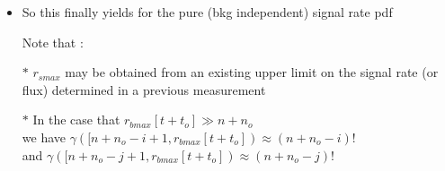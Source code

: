 \Tr
\begin{itemize}
\item So this finally yields for the pure (bkg independent) signal rate pdf
\item[] \begin{center}
      {\blue {}}
        \end{center}
\item[] Note that :
\item[$\ast$] $r_{smax}$ may be obtained from an existing upper limit on the signal rate (or flux)
              determined in a previous measurement
\item[$\ast$] In the case that $r_{bmax}[t+t_{o}] \gg n+n_{o}$\\
      we have $\gamma([n+n_{o}-i+1,r_{bmax}[t+t_{o}]) \approx (n+n_{o}-i)!$\\
      and $\gamma([n+n_{o}-j+1,r_{bmax}[t+t_{o}]) \approx (n+n_{o}-j)!$
\end{itemize}